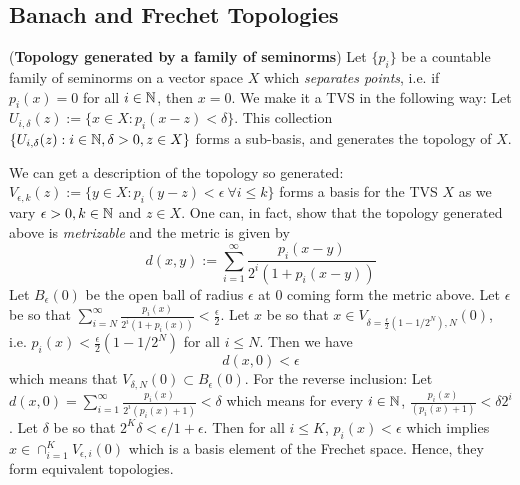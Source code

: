\subsection{Banach and Frechet Topologies}
\begin{example}\label{Example:Seminorm_topology_generated}
    (\textbf{Topology generated by a family of seminorms}) Let $\{p_i\}$ be a countable family of seminorms on a vector space $X$ which \emph{separates points}, i.e. if $p_i(x)=0$ for all $i\in \mathbb{N}$, then $x=0$. We make it a TVS in the following way: Let $U_{i,\delta}(z):=\{x\in X: p_i(x-z)<\delta\}$. This collection $\{U_{i,\delta}(z):i\in \mathbb{N},\delta>0,z\in X\}$ forms a sub-basis, and generates the topology of $X$. 
\end{example}
We can get a description of the topology so generated: $V_{\epsilon,k}(z):=\{y\in X: p_i(y-z)<\epsilon \ \forall i\leq k\}$ forms a basis for the TVS $X$ as we vary $\epsilon>0, k\in \mathbb{N}$ and $z \in X$.
One can, in fact, show that the topology generated above is \emph{metrizable} and the metric is given by \begin{equation}
    d(x,y):=\sum_{i=1}^{\infty} \frac{p_i(x-y)}{2^i(1+p_i(x-y))}
\end{equation}
Let $B_{\epsilon}(0)$ be the open ball of radius $\epsilon$ at $0$ coming form the metric above. Let $\epsilon$ be so that $\sum_{i=N}^{\infty}\frac{p_i(x)}{2^i(1+p_i(x))}<\frac{\epsilon}{2}$. Let $x$ be so that $x\in V_{\delta=\frac{\epsilon}{2}(1-1/2^N), N}(0)$, i.e. $p_i(x)<\frac{\epsilon}{2}(1-1/2^N)$ for all $i\leq N$. Then we have $$d(x,0)< \epsilon $$ which means that $V_{\delta,N}(0)\subset B_{\epsilon}(0)$.
For the reverse inclusion: Let $d(x,0)=\sum_{i=1}^{\infty}\frac{p_i(x)}{2^i(p_i(x)+1)}<\delta$ which means for every $i\in \mathbb{N}$, $\frac{p_i(x)}{(p_i(x)+1)}<\delta 2^i$. Let $\delta$ be so that $2^K \delta<\epsilon/1+\epsilon$. Then for all $i\leq K$, $p_i(x)<\epsilon$ which implies $x\in \cap_{i=1}^K V_{\epsilon,i}(0)$ which is a basis element of the Frechet space. Hence, they form equivalent topologies. 

